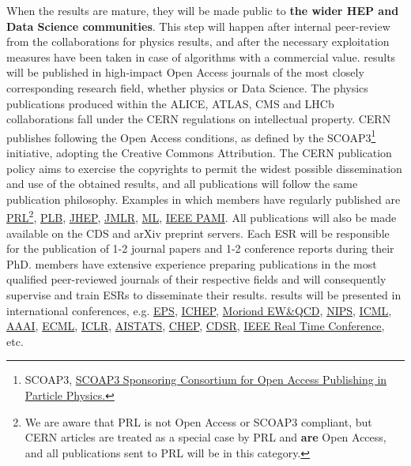 When the results are mature, they will be made public to \textbf{the wider HEP and Data Science communities}. 
This step will happen after internal peer-review from the collaborations for physics results, and after the necessary exploitation measures have been taken in case of algorithms with a commercial value. 
\acronym results will be published in high-impact Open Access journals of the most closely corresponding research field, 
whether physics or Data Science. 
The physics publications produced within the ALICE, ATLAS, CMS and LHCb collaborations fall under the CERN regulations on intellectual
property. CERN publishes following the Open Access conditions, as defined by the SCOAP3\footnote{SCOAP3, \href{http://scoap3.org/}{SCOAP3 Sponsoring Consortium for Open Access Publishing in Particle Physics.}} initiative, adopting the Creative Commons Attribution. 
The CERN publication policy aims to exercise the copyrights to permit the widest possible dissemination and use of the obtained results, and all \acronym publications will follow the same publication philosophy.
Examples in which \acronym members have regularly published are \href{http://journals.aps.org/prl/}{PRL}\footnote{We are aware that PRL is not Open Access or SCOAP3  compliant, but CERN articles are treated as a special case by PRL and \textbf{are} Open Access, and all \acronym publications sent to PRL will be in this category.},  
\href{http://www.journals.elsevier.com/physics-letters-b/}{PLB}, 
\href{http://jhep.sissa.it}{JHEP}, 
\href{http://jmlr.csail.mit.edu}{JMLR}, 
\href{http://www.springer.com/computer/ai/journal/10994}{ML}, 
\href{http://www.computer.org/web/tpami}{IEEE PAMI}.
All publications will also be made available on the CDS and arXiv preprint servers. 
Each ESR will be responsible for the publication of 1-2 journal papers and 1-2 conference reports during their PhD. 
\acronym members have extensive experience preparing publications in the most qualified peer-reviewed journals of their respective fields and will consequently supervise and train
ESRs to disseminate their results.  
\acronym results will be presented in
international conferences, e.g.
\href{https://indico.cern.ch/event/577856/}{EPS},
\href{http://www.ichep2018.org}{ICHEP},
\href{http://moriond.in2p3.fr}{Moriond  EW\&QCD},
\href{http://nips.cc}{NIPS}, \href{http://icml.cc}{ICML}, \href{http://www.aaai.org/Conferences/IAAI/iaai15.php}{AAAI}, \href{http://www.ecmlpkdd2014.org}{ECML},
\href{https://sites.google.com/site/representationlearning2014/}{ICLR}, \href{http://www.aistats.org}{AISTATS}, \href{http://chep2018.org}{CHEP}, \href{http://cdsr.net/papers/}{CDSR}, 
\href{https://indico.cern.ch/event/543031/}{IEEE Real Time Conference}, etc. 

